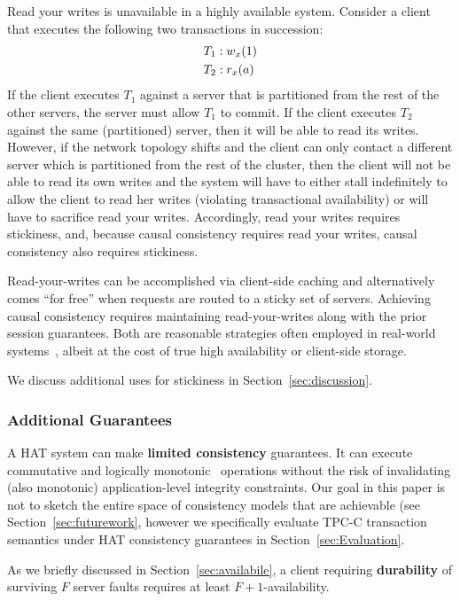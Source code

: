 Read your writes is unavailable in a highly available system. Consider
a client that executes the following two transactions in succession:
\vspace{-.5em}
\begin{align*}
\small
T_1 &: w_x(1)
\\T_2 &: r_x(a)
\end{align*}
If the client executes $T_1$ against a server that is partitioned from
the rest of the other servers, the server must allow $T_1$ to
commit. If the client executes $T_2$ against the same (partitioned)
server, then it will be able to read its writes. However, if the
network topology shifts and the client can only contact a different
server which is partitioned from the rest of the cluster, then the
client will not be able to read its own writes and the system will
have to either stall indefinitely to allow the client to read her
writes (violating transactional availability) or will have to
sacrifice read your writes. Accordingly, read your writes requires
stickiness, and, because causal consistency requires read your writes,
causal consistency also requires stickiness.

Read-your-writes can be accomplished via client-side caching and
alternatively comes ``for free'' when requests are routed to a sticky
set of servers. Achieving causal consistency requires maintaining
read-your-writes along with the prior session guarantees. Both are
reasonable strategies often employed in real-world
systems~\cite{vogels-defs}, albeit at the cost of true high
availability or client-side storage.

We discuss additional uses for stickiness in Section~\ref{sec:discussion}.

\subsubsection{Additional Guarantees}

A HAT system can make \textbf{limited consistency} guarantees. It can
execute commutative and logically monotonic~\cite{needed} operations
without the risk of invalidating (also monotonic) application-level
integrity constraints. Our goal in this paper is not to sketch the
entire space of consistency models that are achievable (see
Section~\ref{sec:futurework}, however we specifically evaluate TPC-C
transaction semantics under HAT consistency guarantees in
Section~\ref{sec:Evaluation}.

As we briefly discussed in Section~\ref{sec:availabile}, a client
requiring \textbf{durability} of surviving $F$ server faults requires
at least $F+1$-availability.

